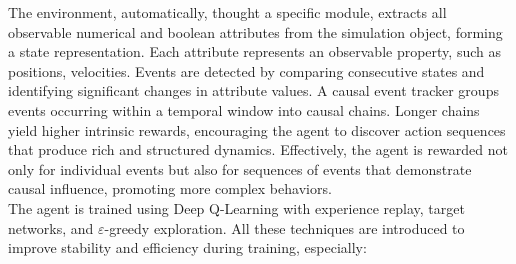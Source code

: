 \documentclass[12pt,a4paper]{report}
\begin{document}
The environment, automatically, thought a specific module,  extracts all observable numerical and boolean attributes from the simulation object, forming a state representation. Each attribute represents an observable property, such as positions, velocities.
Events are detected by comparing consecutive states and identifying significant changes in attribute values.
A causal event tracker groups events occurring within a temporal window into causal chains. Longer chains yield higher intrinsic rewards, encouraging the agent to discover action sequences that produce rich and structured dynamics.
Effectively, the agent is rewarded not only for individual events but also for sequences of events that demonstrate causal influence, promoting more complex behaviors.
\\
The agent is trained using Deep Q-Learning with experience replay, target networks, and $\varepsilon$-greedy exploration. All these techniques are introduced to improve stability and efficiency during training, especially:
\end{document}
